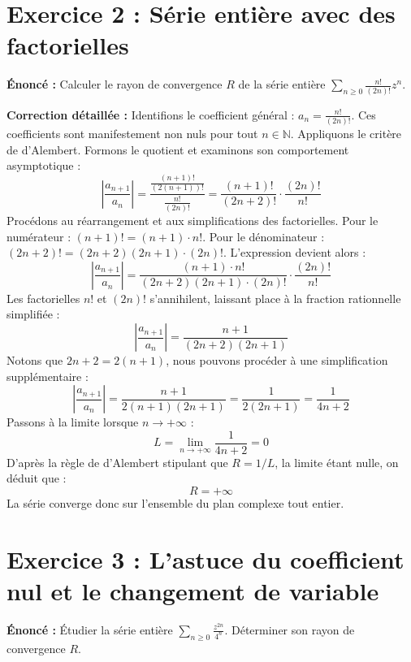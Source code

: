 \documentclass{report}
\begin{document}
\newpage
\chapter*{Exercice 2 : Série entière avec des factorielles}

\textbf{Énoncé :}
Calculer le rayon de convergence $R$ de la série entière $\sum_{n \geq 0} \frac{n!}{(2n)!} z^n$.

\textbf{Correction détaillée :}
Identifions le coefficient général : $a_n = \frac{n!}{(2n)!}$.
Ces coefficients sont manifestement non nuls pour tout $n \in \mathbb{N}$. Appliquons le critère de d'Alembert.
Formons le quotient et examinons son comportement asymptotique :
$$ \left| \frac{a_{n+1}}{a_n} \right| = \frac{\frac{(n+1)!}{(2(n+1))!}}{\frac{n!}{(2n)!}} = \frac{(n+1)!}{(2n+2)!} \cdot \frac{(2n)!}{n!} $$
Procédons au réarrangement et aux simplifications des factorielles.
Pour le numérateur : $(n+1)! = (n+1) \cdot n!$.
Pour le dénominateur : $(2n+2)! = (2n+2)(2n+1) \cdot (2n)!$.
L'expression devient alors :
$$ \left| \frac{a_{n+1}}{a_n} \right| = \frac{(n+1) \cdot n!}{(2n+2)(2n+1) \cdot (2n)!} \cdot \frac{(2n)!}{n!} $$
Les factorielles $n!$ et $(2n)!$ s'annihilent, laissant place à la fraction rationnelle simplifiée :
$$ \left| \frac{a_{n+1}}{a_n} \right| = \frac{n+1}{(2n+2)(2n+1)} $$
Notons que $2n+2 = 2(n+1)$, nous pouvons procéder à une simplification supplémentaire :
$$ \left| \frac{a_{n+1}}{a_n} \right| = \frac{n+1}{2(n+1)(2n+1)} = \frac{1}{2(2n+1)} = \frac{1}{4n+2} $$
Passons à la limite lorsque $n \to +\infty$ :
$$ L = \lim_{n \to +\infty} \frac{1}{4n+2} = 0 $$
D'après la règle de d'Alembert stipulant que $R = 1/L$, la limite étant nulle, on déduit que :
$$ R = +\infty $$
La série converge donc sur l'ensemble du plan complexe tout entier.

\newpage
\chapter*{Exercice 3 : L'astuce du coefficient nul et le changement de variable}

\textbf{Énoncé :}
Étudier la série entière $\sum_{n \geq 0} \frac{z^{2n}}{4^n}$. Déterminer son rayon de convergence $R$.
\end{document}
